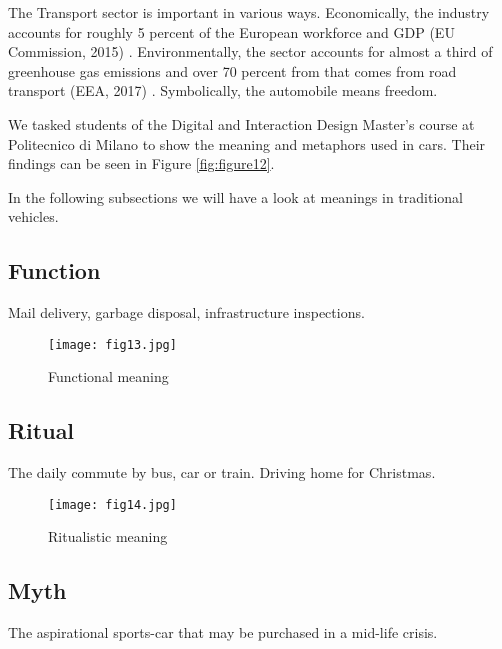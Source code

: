 \documentclass[12pt, usenames, dvipsnames]{report}
\begin{document}
\begin{flushleft}
The Transport sector is important in various ways.
Economically, the industry accounts for roughly 5 percent of the European workforce and GDP (EU Commission, 2015) \cite{eucom2015}.
Environmentally, the sector accounts for almost a third of greenhouse gas emissions and over 70 percent from that comes from road transport (EEA, 2017) \cite{eea2019}. 
Symbolically, the automobile means freedom.

We tasked students of the Digital and Interaction Design Master's course at Politecnico di Milano to show the meaning and metaphors used in cars.
Their findings can be seen in Figure \ref{fig:figure12}.

In the following subsections we will have a look at meanings in traditional vehicles.

\subsection{Function}

Mail delivery, garbage disposal, infrastructure inspections.

\vspace*{1.2em}
\begin{figure}[!htbp]
  \hspace*{5em}
  \texttt{[image: fig13.jpg]}
  \caption{Functional meaning}
  \label{fig:figure13}
\end{figure}
\vspace*{1.2em}

\subsection{Ritual}

The daily commute by bus, car or train.
Driving home for Christmas.

\vspace*{1.2em}
\begin{figure}[!htbp]
  \hspace*{5em}
  \texttt{[image: fig14.jpg]}
  \caption{Ritualistic meaning}
  \label{fig:figure14}
\end{figure}
\vspace*{1.2em}

\subsection{Myth}

The aspirational sports-car that may be purchased in a mid-life crisis.


\end{flushleft}
\end{document}
